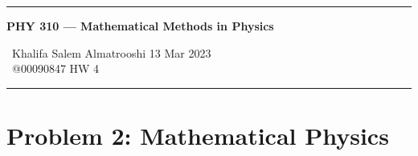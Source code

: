 \documentclass{article}
\begin{document}
	\begin{center}
		\hrule
		\vspace{0.4cm}
		{\textbf { \large PHY 310 --- Mathematical Methods in Physics}}
		\vspace{0.4cm}
	\end{center}
	{ \ Khalifa Salem Almatrooshi \hspace{\fill}  13 Mar 2023 \\
		{ } \ @00090847 \hspace{\fill}  HW 4 \\
		\hrule	
	

	\section*{Problem 2: Mathematical Physics}
}
\end{document}

